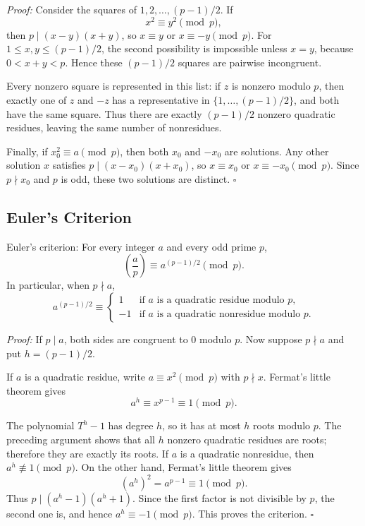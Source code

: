 \documentclass[a4paper,11pt,abstracton]{scrartcl}
\theoremstyle{dotlessP}
\theoremstyle{dotlessS}
\theoremstyle{remark}
\theoremstyle{definition}
\begin{document}
\begin{claim_box}
\textit{Proof:}
Consider the squares of $1,2,\ldots,(p-1)/2$. If
\[
    x^2\equiv y^2\pmod p,
\]
then $p\mid(x-y)(x+y)$, so $x\equiv y$ or $x\equiv-y\pmod p$.
For $1\leq x,y\leq(p-1)/2$, the second possibility is impossible
unless $x=y$, because $0<x+y<p$. Hence these $(p-1)/2$ squares are
pairwise incongruent.

Every nonzero square is represented in this list: if $z$ is nonzero
modulo $p$, then exactly one of $z$ and $-z$ has a representative in
$\{1,\ldots,(p-1)/2\}$, and both have the same square. Thus there are
exactly $(p-1)/2$ nonzero quadratic residues, leaving the same number
of nonresidues.

Finally, if $x_0^2\equiv a\pmod p$, then both $x_0$ and $-x_0$ are
solutions. Any other solution $x$ satisfies
$p\mid(x-x_0)(x+x_0)$, so $x\equiv x_0$ or $x\equiv-x_0\pmod p$.
Since $p\nmid x_0$ and $p$ is odd, these two solutions are distinct.
\hfill$\square$
\end{claim_box}

\subsection{Euler's Criterion}

\begin{mainbox}{Euler's criterion:}
For every integer $a$ and every odd prime $p$,
\[
    \boxed{\left(\frac ap\right)
      \equiv a^{(p-1)/2}\pmod p.}
\]
In particular, when $p\nmid a$,
\[
    a^{(p-1)/2}\equiv
      \begin{cases}
          1  & \text{if $a$ is a quadratic residue modulo $p$},\\
         -1  & \text{if $a$ is a quadratic nonresidue modulo $p$}.
      \end{cases}
\]
\end{mainbox}

\begin{claim_box}
\textit{Proof:}
If $p\mid a$, both sides are congruent to $0$ modulo $p$.
Now suppose $p\nmid a$ and put $h=(p-1)/2$.

If $a$ is a quadratic residue, write $a\equiv x^2\pmod p$ with
$p\nmid x$. Fermat's little theorem gives
\[
    a^h\equiv x^{p-1}\equiv1\pmod p.
\]

The polynomial $T^h-1$ has degree $h$, so it has at most $h$ roots
modulo $p$. The preceding argument shows that all $h$ nonzero
quadratic residues are roots; therefore they are exactly its roots.
If $a$ is a quadratic nonresidue, then $a^h\not\equiv1\pmod p$.
On the other hand, Fermat's little theorem gives
\[
    (a^h)^2=a^{p-1}\equiv1\pmod p.
\]
Thus $p\mid(a^h-1)(a^h+1)$. Since the first factor is not divisible
by $p$, the second one is, and hence $a^h\equiv-1\pmod p$.
This proves the criterion.
\hfill$\square$
\end{claim_box}
\end{document}
